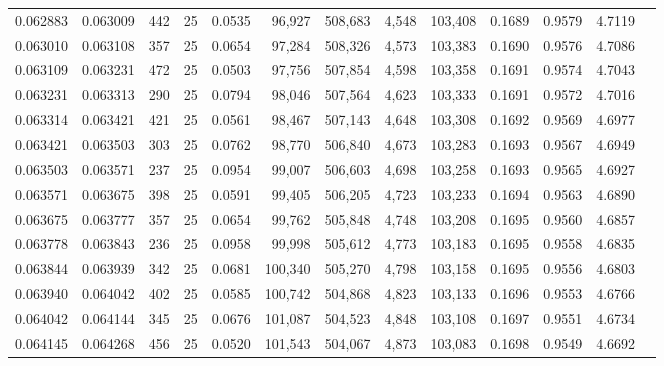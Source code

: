 \begin{tabular}{rrrrrrrrrrrrr}
0.062883 & 0.063009 &   442 &  25 &                                     0.0535 &  96,927 & 508,683 &   4,548 & 103,408 & 0.1689 & 0.9579 & 4.7119 \\
0.063010 & 0.063108 &   357 &  25 &                                     0.0654 &  97,284 & 508,326 &   4,573 & 103,383 & 0.1690 & 0.9576 & 4.7086 \\
0.063109 & 0.063231 &   472 &  25 &                                     0.0503 &  97,756 & 507,854 &   4,598 & 103,358 & 0.1691 & 0.9574 & 4.7043 \\
0.063231 & 0.063313 &   290 &  25 &                                     0.0794 &  98,046 & 507,564 &   4,623 & 103,333 & 0.1691 & 0.9572 & 4.7016 \\
0.063314 & 0.063421 &   421 &  25 &                                     0.0561 &  98,467 & 507,143 &   4,648 & 103,308 & 0.1692 & 0.9569 & 4.6977 \\
0.063421 & 0.063503 &   303 &  25 &                                     0.0762 &  98,770 & 506,840 &   4,673 & 103,283 & 0.1693 & 0.9567 & 4.6949 \\
0.063503 & 0.063571 &   237 &  25 &                                     0.0954 &  99,007 & 506,603 &   4,698 & 103,258 & 0.1693 & 0.9565 & 4.6927 \\
0.063571 & 0.063675 &   398 &  25 &                                     0.0591 &  99,405 & 506,205 &   4,723 & 103,233 & 0.1694 & 0.9563 & 4.6890 \\
0.063675 & 0.063777 &   357 &  25 &                                     0.0654 &  99,762 & 505,848 &   4,748 & 103,208 & 0.1695 & 0.9560 & 4.6857 \\
0.063778 & 0.063843 &   236 &  25 &                                     0.0958 &  99,998 & 505,612 &   4,773 & 103,183 & 0.1695 & 0.9558 & 4.6835 \\
0.063844 & 0.063939 &   342 &  25 &                                     0.0681 & 100,340 & 505,270 &   4,798 & 103,158 & 0.1695 & 0.9556 & 4.6803 \\
0.063940 & 0.064042 &   402 &  25 &                                     0.0585 & 100,742 & 504,868 &   4,823 & 103,133 & 0.1696 & 0.9553 & 4.6766 \\
0.064042 & 0.064144 &   345 &  25 &                                     0.0676 & 101,087 & 504,523 &   4,848 & 103,108 & 0.1697 & 0.9551 & 4.6734 \\
0.064145 & 0.064268 &   456 &  25 &                                     0.0520 & 101,543 & 504,067 &   4,873 & 103,083 & 0.1698 & 0.9549 & 4.6692 \\

\end{tabular}
